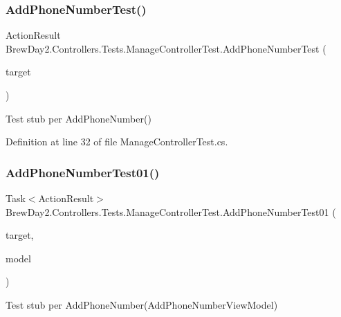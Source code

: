 \subsubsection{\texorpdfstring{Add\+Phone\+Number\+Test()}{AddPhoneNumberTest()}}
{\footnotesize\ttfamily Action\+Result Brew\+Day2.\+Controllers.\+Tests.\+Manage\+Controller\+Test.\+Add\+Phone\+Number\+Test (\begin{DoxyParamCaption}\item[{\mbox{[}\+Pex\+Assume\+Under\+Test\mbox{]} \mbox{\hyperlink{class_brew_day2_1_1_controllers_1_1_manage_controller}{Manage\+Controller}}}]{target }\end{DoxyParamCaption})}



Test stub per Add\+Phone\+Number()



Definition at line 32 of file Manage\+Controller\+Test.\+cs.

\mbox{\label{class_brew_day2_1_1_controllers_1_1_tests_1_1_manage_controller_test_a6a266f39fd002f3b7cc81174afe0cb96}} 
\subsubsection{\texorpdfstring{Add\+Phone\+Number\+Test01()}{AddPhoneNumberTest01()}}
{\footnotesize\ttfamily Task$<$Action\+Result$>$ Brew\+Day2.\+Controllers.\+Tests.\+Manage\+Controller\+Test.\+Add\+Phone\+Number\+Test01 (\begin{DoxyParamCaption}\item[{\mbox{[}\+Pex\+Assume\+Under\+Test\mbox{]} \mbox{\hyperlink{class_brew_day2_1_1_controllers_1_1_manage_controller}{Manage\+Controller}}}]{target,  }\item[{\mbox{\hyperlink{class_brew_day2_1_1_models_1_1_add_phone_number_view_model}{Add\+Phone\+Number\+View\+Model}}}]{model }\end{DoxyParamCaption})}



Test stub per Add\+Phone\+Number(\+Add\+Phone\+Number\+View\+Model)



